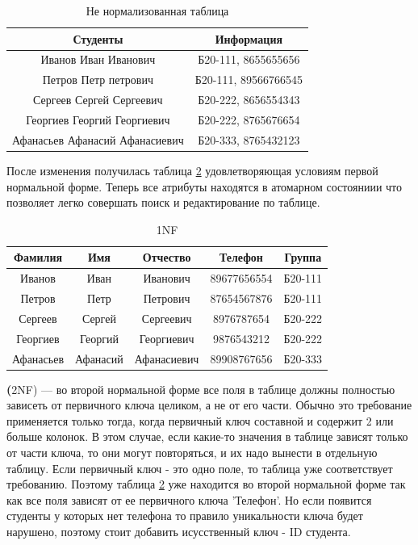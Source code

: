 \documentclass[a4paper]{article}
\begin{document}
\begin{table}[h]
      \caption{Не нормализованная таблица}
      \begin{center}\label{tab:0NF}
      \begin{tabular}{|c|c|}
        \hline
        Студенты & Информация \\
        \hline
        Иванов Иван Иванович & Б20-111, 8655655656\\
        Петров Петр петрович & Б20-111, 89566766545\\
        Сергеев Сергей Сергеевич & Б20-222, 8656554343\\
        Георгиев Георгий Георгиевич & Б20-222, 8765676654\\
        Афанасьев Афанасий Афанасиевич & Б20-333, 8765432123\\
        \hline
      \end{tabular}
    \end{center}
  \end{table}

\noindent После изменения получилась таблица \ref{tab:1NFDONE} удовлетворяющая условиям первой нормальной форме. Теперь все атрибуты находятся в атомарном состояниии что позволяет легко совершать поиск и редактирование по таблице.

\begin{table}[h]
      \caption{1NF}
      \begin{center}\label{tab:1NFDONE}
      \begin{tabular}{|c|c|c|c|c|}
        \hline
        Фамилия & Имя & Отчество & Телефон & Группа\\
        \hline
        Иванов & Иван & Иванович & 89677656554 & Б20-111\\
        Петров & Петр & Петрович & 87654567876 & Б20-111\\
        Сергеев & Сергей & Сергеевич & 8976787654 & Б20-222\\
        Георгиев & Георгий & Георгиевич & 9876543212 & Б20-222\\
        Афанасьев & Афанасий & Афанасиевич & 89908767656 & Б20-333\\
        \hline
      \end{tabular}
    \end{center}
  \end{table}

\noindent \textbf(2NF) --- во второй нормальной форме все поля в таблице должны полностью зависеть от первичного ключа целиком, а не от его части. Обычно это требование применяется только тогда, когда первичный ключ составной и содержит 2 или больше колонок. В этом случае, если какие-то значения в таблице зависят только от части ключа, то они могут повторяться, и их надо вынести в отдельную таблицу. Если первичный ключ - это одно поле, то таблица уже соответствует требованию. Поэтому таблица \ref{tab:1NFDONE} уже находится во второй нормальной форме так как все поля зависят от ее первичного ключа 'Телефон'. Но если появится студенты у которых нет телефона то правило уникальности ключа будет нарушено, поэтому стоит добавить исусственный ключ - ID студента.
\end{document}
